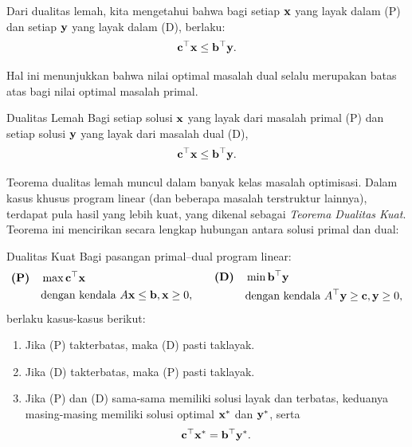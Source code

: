 Dari dualitas lemah, kita mengetahui bahwa bagi setiap $\mathbf{x}$ yang layak dalam (P) dan setiap $\mathbf{y}$ yang layak dalam (D), berlaku:
\[
\mathbf{c}^\top \mathbf{x} \leq \mathbf{b}^\top \mathbf{y}.
\]

Hal ini menunjukkan bahwa nilai optimal masalah dual selalu merupakan batas atas bagi nilai optimal masalah primal.

\begin{theorem}{Dualitas Lemah}\label{thm:weak-duality}
Bagi setiap solusi $\mathbf{x}$ yang layak dari masalah primal (P) dan setiap solusi $\mathbf{y}$ yang layak dari masalah dual (D),
\[
\mathbf{c}^\top \mathbf{x} \leq \mathbf{b}^\top \mathbf{y}.
\]
\end{theorem}

Teorema dualitas lemah muncul dalam banyak kelas masalah optimisasi. Dalam kasus khusus program linear (dan beberapa masalah terstruktur lainnya), terdapat pula hasil yang lebih kuat, yang dikenal sebagai \emph{Teorema Dualitas Kuat}. Teorema ini mencirikan secara lengkap hubungan antara solusi primal dan dual:

\begin{theorem}{Dualitas Kuat}\label{thm:strong-duality}
Bagi pasangan primal--dual program linear:
\[
\begin{aligned}
\textbf{(P)} \quad &\max \mathbf{c}^\top \mathbf{x} \\
&\mbox{dengan kendala } A \mathbf{x} \leq \mathbf{b}, \mathbf{x} \geq 0,
\end{aligned}
\quad\quad
\begin{aligned}
\textbf{(D)} \quad &\min \mathbf{b}^\top \mathbf{y} \\
&\mbox{dengan kendala } A^\top \mathbf{y} \geq \mathbf{c}, \mathbf{y} \geq 0,
\end{aligned}
\]
berlaku kasus-kasus berikut:
\begin{enumerate}
\item Jika (P) takterbatas, maka (D) pasti taklayak.
\item Jika (D) takterbatas, maka (P) pasti taklayak.
\item Jika (P) dan (D) sama-sama memiliki solusi layak dan terbatas, keduanya masing-masing memiliki solusi optimal $\mathbf{x}^*$ dan $\mathbf{y}^*$, serta
\[
\mathbf{c}^\top \mathbf{x}^* = \mathbf{b}^\top \mathbf{y}^*.
\]
\end{enumerate}
\end{theorem}

